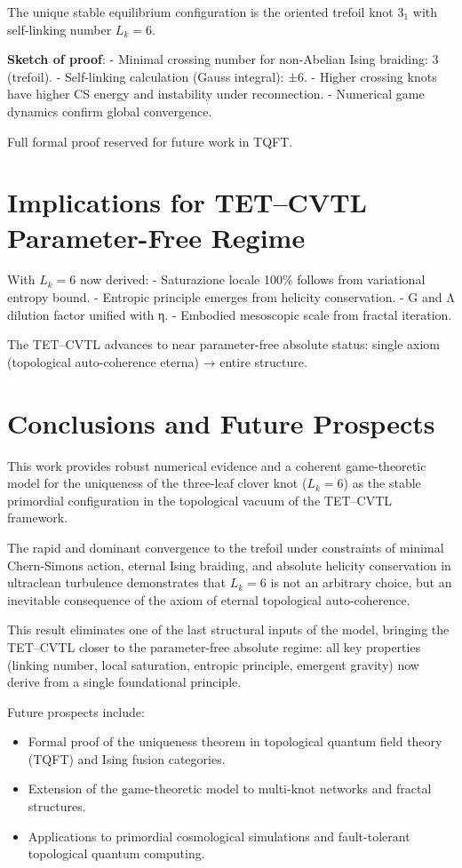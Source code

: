 \documentclass[11pt,a4paper]{article}
\begin{document}
The unique stable equilibrium configuration is the oriented trefoil knot 3$_1$ with self-linking number $L_k = 6$.

\textbf{Sketch of proof}:
- Minimal crossing number for non-Abelian Ising braiding: 3 (trefoil).
- Self-linking calculation (Gauss integral): ±6.
- Higher crossing knots have higher CS energy and instability under reconnection.
- Numerical game dynamics confirm global convergence.

Full formal proof reserved for future work in TQFT.

\section{Implications for TET–CVTL Parameter-Free Regime}

With $L_k = 6$ now derived:
- Saturazione locale 100\% follows from variational entropy bound.
- Entropic principle emerges from helicity conservation.
- G and Λ dilution factor unified with η.
- Embodied mesoscopic scale from fractal iteration.

The TET–CVTL advances to near parameter-free absolute status: single axiom (topological auto-coherence eterna) → entire structure.

\section{Conclusions and Future Prospects}

This work provides robust numerical evidence and a coherent game-theoretic model for the uniqueness of the three-leaf clover knot ($L_k = 6$) as the stable primordial configuration in the topological vacuum of the TET--CVTL framework.

The rapid and dominant convergence to the trefoil under constraints of minimal Chern-Simons action, eternal Ising braiding, and absolute helicity conservation in ultraclean turbulence demonstrates that $L_k = 6$ is not an arbitrary choice, but an inevitable consequence of the axiom of eternal topological auto-coherence.

This result eliminates one of the last structural inputs of the model, bringing the TET--CVTL closer to the parameter-free absolute regime: all key properties (linking number, local saturation, entropic principle, emergent gravity) now derive from a single foundational principle.

Future prospects include:
\begin{itemize}
  \item Formal proof of the uniqueness theorem in topological quantum field theory (TQFT) and Ising fusion categories.
  \item Extension of the game-theoretic model to multi-knot networks and fractal structures.
  \item Applications to primordial cosmological simulations and fault-tolerant topological quantum computing.
\end{itemize}
\end{document}
